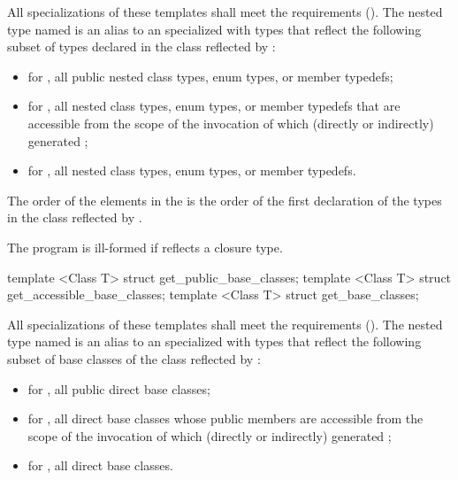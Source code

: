 \begin{std.txt}
\begin{itemdescr}
\pnum
All specializations of these templates shall meet the  requirements (). The nested type named  is an alias to an  specialized with  types that reflect the following subset of types declared in the class reflected by :
\begin{itemize}
  \item for , all public nested class types, enum types, or member typedefs;
  \item for , all nested class types, enum types, or member typedefs that are accessible from the scope of the invocation of  which (directly or indirectly) generated ;
  \item for , all nested class types, enum types, or member typedefs.
\end{itemize}

\pnum
The order of the elements in the  is the order of the first declaration of the types in the class reflected by .

\pnum
\remarks
The program is ill-formed if  reflects a closure type.
\end{itemdescr}

\begin{itemdecl}
template <Class T> struct get_public_base_classes;
template <Class T> struct get_accessible_base_classes;
template <Class T> struct get_base_classes;
\end{itemdecl}

\begin{itemdescr}
\pnum
All specializations of these templates shall meet the  requirements (). The nested type named  is an alias to an  specialized with  types that reflect the following subset of base classes of the class reflected by :
\begin{itemize}
  \item for , all public direct base classes;
  \item for , all direct base classes whose public members are accessible from the scope of the invocation of  which (directly or indirectly) generated ;
  \item for , all direct base classes.
\end{itemize}


\end{itemdescr}
\end{std.txt}
